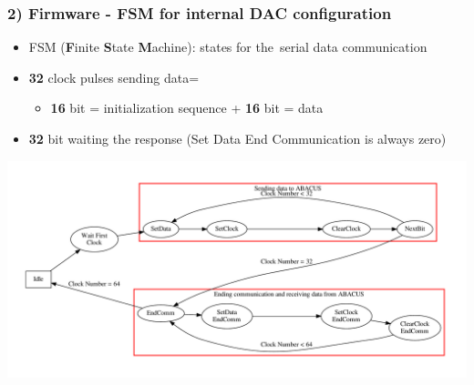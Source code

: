 \documentclass[aspectratio=169]{beamer}
\begin{document}
	\begin{frame}%
		\frametitle{2) Firmware - FSM for internal DAC configuration}
		\begin{itemize}
			\item FSM (\textbf{F}inite \textbf{S}tate \textbf{M}achine): states for the~serial data communication
			\item \textbf{32} clock pulses sending data=
			\begin{itemize}
				\item \textbf{16} bit = initialization sequence + \textbf{16} bit = data
			\end{itemize}
			\item \textbf{32} bit waiting the response (Set Data End Communication is always zero)
		\end{itemize}
		\begin{center}
			\includegraphics[width=0.85 \textwidth]{IMG2/InternalDACsFSM.pdf}
		\end{center}
	\end{frame}


\end{document}
